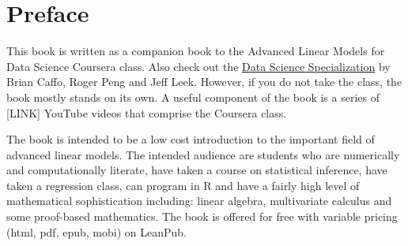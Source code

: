 \chapter*{Preface}

This book is written as a companion book to the
Advanced Linear Models for Data Science
Coursera class. Also check out the \href{https://www.coursera.org/specialization/jhudatascience/1}{Data Science Specialization} by Brian Caffo, Roger Peng and Jeff Leek. However, if you do not take the class, the book mostly stands on its own. A
useful component of the book is a series of [LINK] YouTube videos that comprise the
Coursera class.

The book is intended to be a low cost introduction to the important field of
advanced linear models. The intended audience are students who are numerically
and computationally literate, have taken a
course on statistical inference, have taken a regression class, can program in R
and have a fairly high level of mathematical sophistication including: linear algebra,
multivariate calculus and some proof-based mathematics.
The book is offered for free with variable pricing (html, pdf, epub, mobi) on
LeanPub.


